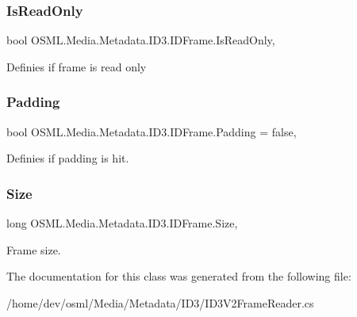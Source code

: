 \subsubsection{\texorpdfstring{IsReadOnly}{IsReadOnly}}
{\footnotesize\ttfamily bool O\+S\+M\+L.\+Media.\+Metadata.\+I\+D3.\+I\+D\+Frame.\+Is\+Read\+Only\hspace{0.3cm}{\ttfamily [get]}, {\ttfamily [set]}}



Definies if frame is read only 

\mbox{\label{classOSML_1_1Media_1_1Metadata_1_1ID3_1_1IDFrame_a2e206be9e411b558c7e4594c62a6d34c}} 
\subsubsection{\texorpdfstring{Padding}{Padding}}
{\footnotesize\ttfamily bool O\+S\+M\+L.\+Media.\+Metadata.\+I\+D3.\+I\+D\+Frame.\+Padding = false\hspace{0.3cm}{\ttfamily [get]}, {\ttfamily [set]}}



Definies if padding is hit. 

\mbox{\label{classOSML_1_1Media_1_1Metadata_1_1ID3_1_1IDFrame_aa3ffb4beb1863f63830eb365edbfb507}} 
\subsubsection{\texorpdfstring{Size}{Size}}
{\footnotesize\ttfamily long O\+S\+M\+L.\+Media.\+Metadata.\+I\+D3.\+I\+D\+Frame.\+Size\hspace{0.3cm}{\ttfamily [get]}, {\ttfamily [set]}}



Frame size. 



The documentation for this class was generated from the following file\+:\begin{DoxyCompactItemize}
\item 
/home/dev/osml/\+Media/\+Metadata/\+I\+D3/I\+D3\+V2\+Frame\+Reader.\+cs\end{DoxyCompactItemize}
